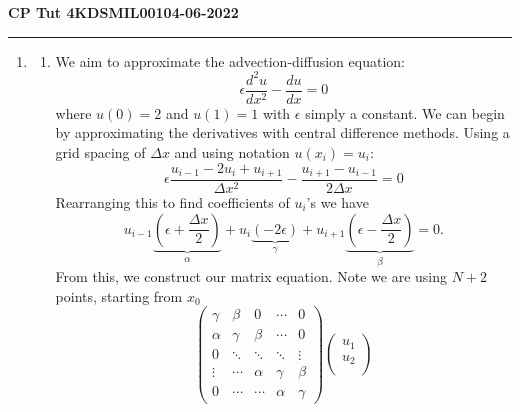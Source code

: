 \documentclass[11pt]{article}
\begin{document}
\begin{center}
    \textbf{CP Tut 4}\hspace{1.5in}\textbf{KDSMIL001}\hspace{1.5in}\textbf{04-06-2022}
\end{center}
\rule{\textwidth}{1pt}

\begin{enumerate}
    \item \begin{enumerate}
        \item We aim to approximate the advection-diffusion equation:
        \begin{equation}
            \epsilon\frac{d^2u}{dx^2}-\frac{du}{dx}=0
            \label{eqn:advection-diffusion}
        \end{equation}
        where $u(0)=2$ and $u(1)=1$ with $\epsilon$ simply a constant. We can begin by approximating the derivatives with central difference methods. Using a grid spacing of $\Delta x$ and using notation $u(x_i)=u_i$:
        \begin{equation*}
            \epsilon\frac{u_{i-1}-2u_i+u_{i+1}}{\Delta x^2}-\frac{u_{i+1}-u_{i-1}}{2\Delta x}=0
        \end{equation*}
        Rearranging this to find coefficients of $u_i$'s we have
        \begin{equation*}
            u_{i-1}\underbrace{\left(\epsilon+\frac{\Delta x}{2}\right)}_\alpha +u_i\underbrace{(-2\epsilon)}_\gamma +u_{i+1}\underbrace{\left(\epsilon-\frac{\Delta x}{2}\right)}_\beta=0.
        \end{equation*}
        From this, we construct our matrix equation. Note we are using $N+2$ points, starting from $x_0$
        \begin{equation*}
            \begin{pmatrix}
                \gamma & \beta & 0 & \cdots & 0 \\
                \alpha & \gamma & \beta & \cdots & 0 \\
                0 & \ddots & \ddots & \ddots & \vdots \\
                \vdots & \cdots & \alpha & \gamma & \beta \\
                0 & \cdots & \cdots & \alpha & \gamma
            \end{pmatrix}
            \begin{pmatrix}
                u_1 \\
                u_2 \\

\end{pmatrix}
\end{equation*}
\end{enumerate}
\end{enumerate}
\end{document}
